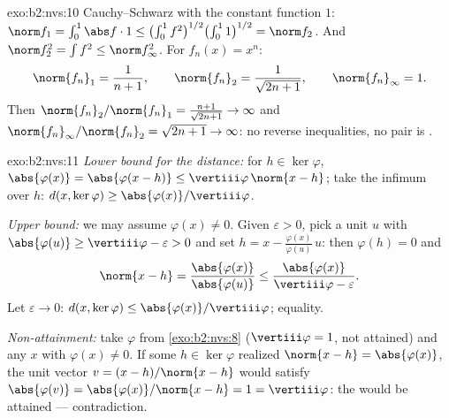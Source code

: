 \begin{solution}{exo:b2:nvs:10}
Cauchy--Schwarz with the constant function $1$: $\norm f_1 =
\int_0^1 \abs f\cdot 1 \leq \bigl(\int_0^1
f^2\bigr)^{1/2}\bigl(\int_0^1 1\bigr)^{1/2} = \norm f_2$. And
$\norm f_2^2 = \int f^2 \leq \norm f_\infty^2$. For $f_n(x) =
x^n$:
\[
\norm{f_n}_1 = \frac1{n+1}, \qquad
\norm{f_n}_2 = \frac1{\sqrt{2n+1}}, \qquad
\norm{f_n}_\infty = 1 .
\]
Then $\norm{f_n}_2/\norm{f_n}_1 = \frac{n+1}{\sqrt{2n+1}} \to
\infty$ and $\norm{f_n}_\infty/\norm{f_n}_2 = \sqrt{2n+1} \to
\infty$: no reverse inequalities, no pair is .
\end{solution}

\begin{solution}{exo:b2:nvs:11}
\emph{Lower bound for the distance:} for $h \in \ker\varphi$,
$\abs{\varphi(x)} = \abs{\varphi(x - h)} \leq
\vertiii\varphi\,\norm{x - h}$; take the infimum over $h$:
$d(x, \ker\varphi) \geq \abs{\varphi(x)}/\vertiii\varphi$.

\emph{Upper bound:} we may assume $\varphi(x) \neq 0$. Given
$\varepsilon > 0$, pick a unit $u$ with $\abs{\varphi(u)} \geq
\vertiii\varphi - \varepsilon > 0$ and set $h = x -
\frac{\varphi(x)}{\varphi(u)}\,u$: then $\varphi(h) = 0$ and
\[
\norm{x - h} = \frac{\abs{\varphi(x)}}{\abs{\varphi(u)}}
\leq \frac{\abs{\varphi(x)}}{\vertiii\varphi - \varepsilon}.
\]
Let $\varepsilon \to 0$: $d(x, \ker\varphi) \leq
\abs{\varphi(x)}/\vertiii\varphi$; equality.

\emph{Non-attainment:} take $\varphi$ from \cref{exo:b2:nvs:8}
($\vertiii\varphi = 1$, not attained) and any $x$ with
$\varphi(x) \neq 0$. If some $h \in \ker\varphi$ realized
$\norm{x - h} = \abs{\varphi(x)}$, the unit vector $v = (x -
h)/\norm{x - h}$ would satisfy $\abs{\varphi(v)} =
\abs{\varphi(x)}/\norm{x - h} = 1 = \vertiii\varphi$: the
 would be attained --- contradiction.
\end{solution}

